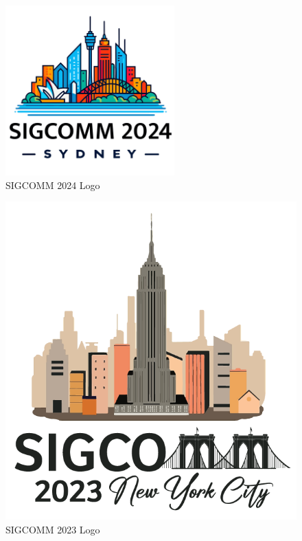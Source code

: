 \documentclass[sigconf, 10pt]{acmart}
\begin{document}
\begin{figure}[h]
	\centering
	\includegraphics[width=\columnwidth]{./appendix/sigcomm24-logo.png}
	\caption{SIGCOMM 2024 Logo}
	\label{fig:sigcomm24logo}
\end{figure}

\begin{figure}[h]
	\centering
	\includegraphics[width=\columnwidth]{./appendix/sigcomm23-logo.png}
	\caption{SIGCOMM 2023 Logo}
	\label{fig:sigcomm23logo}
\end{figure}
\end{document}
